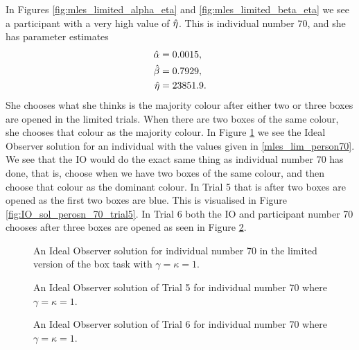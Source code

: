 In Figures \ref{fig:mles_limited_alpha_eta} and \ref{fig:mles_limited_beta_eta} we see a participant with a very high value of $\hat{\eta}$. This is individual number 70, and she has  parameter estimates
\begin{equation}
\label{mles_lim_person70}
    \begin{aligned}
        \hat{\alpha} &= 0.0015,\\
        \hat{\beta} &= 0.7929,\\
        \hat{\eta} &= 23851.9.
    \end{aligned}
\end{equation}
She chooses what she thinks is the majority colour after either two or three boxes are opened in the limited trials. When there are two boxes of the same colour, she chooses that colour as the majority colour. In Figure \ref{fig:IO_sol_person_70} we see the Ideal Observer solution for an individual with the values given in \eqref{mles_lim_person70}. We see that the IO would do the exact same thing as individual number 70 has done, that is, choose when we have two boxes of the same colour, and then choose that colour as the dominant colour. In Trial 5 that is after two boxes are opened as the first two boxes are blue. This is visualised in Figure \ref{fig:IO_sol_perosn_70_trial5}. In Trial 6 both the IO and participant number 70 chooses after three boxes are opened as seen in Figure \ref{fig:IO_sol_person70_trial6}.
\begin{figure}
    \centering
    \scalebox{0.7}{}
    \caption[Ideal Observer solution individual 70, limited. $\gamma=\kappa=1$]{An Ideal Observer solution for individual number 70 in the limited version of the box task with $\gamma=\kappa=1$.}
    \label{fig:IO_sol_person_70}
\end{figure}

\begin{figure}
    \centering
    \begin{minipage}{0.48\textwidth}
        \centering
        \scalebox{0.7}{}
        \caption[Ideal Observer solution individual 70 in trial 5. $\gamma=\kappa=1$]{An Ideal Observer solution of Trial 5 for individual number 70 where $\gamma=\kappa=1$.}
        \label{fig:IO_sol_perosn_70_trial5}
    \end{minipage}
    \hfill
    \begin{minipage}{0.48\textwidth}
        \centering
        \scalebox{0.7}{}
        \caption[Ideal Observer solution individual 70 in trial 6. $\gamma=\kappa=1$]{An Ideal Observer solution of Trial 6 for individual number 70 where $\gamma=\kappa=1$.}
        \label{fig:IO_sol_person70_trial6}
    \end{minipage}
\end{figure}

